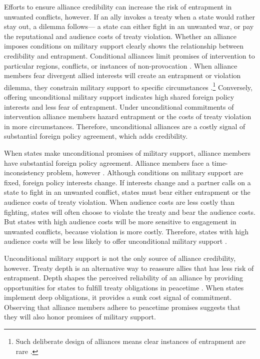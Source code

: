 \documentclass[12pt]{article}
\begin{document}
Efforts to ensure alliance credibility can increase the risk of entrapment in unwanted conflicts, however. 
If an ally invokes a treaty when a state would rather stay out, a dilemma follows--- a state can either fight in an unwanted war, or pay the reputational \citep{Gibler2008, Crescenzietal2012} and audience \citep{Fearon1997} costs of treaty violation.  
Whether an alliance imposes conditions on military support clearly shows the relationship between credibility and entrapment.
Conditional alliances limit promises of intervention to particular regions, conflicts, or instances of non-provocation \citep{Leedsetal2000}. 
When alliance members fear divergent allied interests will create an entrapment or violation dilemma, they constrain military support to specific circumstances \citep{Kim2011, Benson2012}.\footnote{Such deliberate design of alliances means clear instances of entrapment are rare \citep{Kim2011, Beckley2015}.} 
Conversely, offering unconditional military support indicates high shared foreign policy interests and less fear of entrapment.
Under unconditional commitments of intervention alliance members hazard entrapment or the costs of treaty violation in more circumstances. 
Therefore, unconditional alliances are a costly signal of substantial foreign policy agreement, which adds credibility.  


When states make unconditional promises of military support, alliance members have substantial foreign policy agreement.
Alliance members face a time-inconsistency problem, however \citep{LeedsSavun2007}. 
Although conditions on military support are fixed, foreign policy interests change. 
If interests change and a partner calls on a state to fight in an unwanted conflict, states must bear either entrapment or the audience costs of treaty violation.
When audience costs are less costly than fighting, states will often choose to violate the treaty and bear the audience costs.   
But states with high audience costs will be more sensitive to engagement in unwanted conflicts, because violation is more costly. 
Therefore, states with high audience costs will be less likely to offer unconditional military support  \citep{Chibaetal2015}. 


Unconditional military support is not the only source of alliance credibility, however. 
Treaty depth is an alternative way to reassure allies that has less risk of entrapment. 
Depth shapes the perceived reliability of an alliance by providing opportunities for states to fulfill treaty obligations in peacetime \citep{Morrow1994}. 
When states implement deep obligations, it provides a sunk cost signal of commitment.
Observing that alliance members adhere to peacetime promises suggests that they will also honor promises of military support. 
\end{document}
